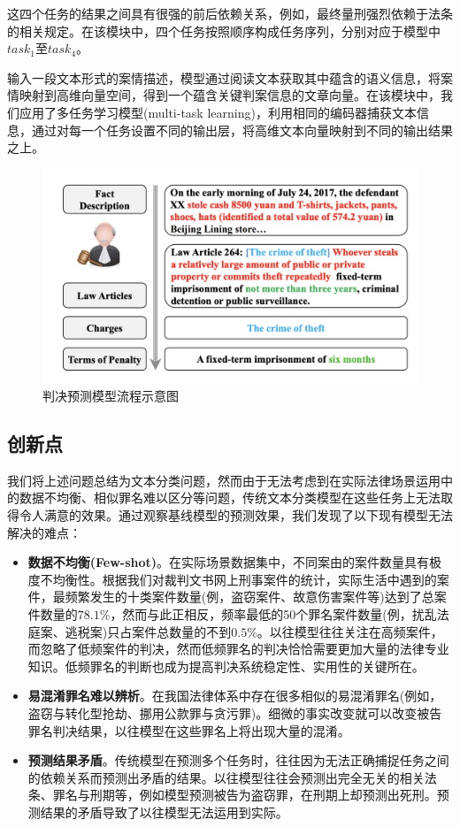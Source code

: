 这四个任务的结果之间具有很强的前后依赖关系，例如，最终量刑强烈依赖于法条的相关规定。在该模块中，四个任务按照顺序构成任务序列，分别对应于模型中$task_{1}$至$task_{4}$。

输入一段文本形式的案情描述，模型通过阅读文本获取其中蕴含的语义信息，将案情映射到高维向量空间，得到一个蕴含关键判案信息的文章向量。在该模块中，我们应用了多任务学习模型(multi-task learning)，利用相同的编码器捕获文本信息，通过对每一个任务设置不同的输出层，将高维文本向量映射到不同的输出结果之上。
\begin{figure}[ht]
    \centering
    \includegraphics[width=\linewidth]{figures/JudgePrediction.png}
    \caption{判决预测模型流程示意图}
    \label{fig:JudgePrediction}
\end{figure}


\subsection{创新点}
我们将上述问题总结为文本分类问题，然而由于无法考虑到在实际法律场景运用中的数据不均衡、相似罪名难以区分等问题，传统文本分类模型在这些任务上无法取得令人满意的效果。通过观察基线模型的预测效果，我们发现了以下现有模型无法解决的难点：
\begin{itemize}
	\item \textbf{数据不均衡(Few-shot)}。在实际场景数据集中，不同案由的案件数量具有极度不均衡性。根据我们对裁判文书网上刑事案件的统计，实际生活中遇到的案件，最频繁发生的十类案件数量(例，盗窃案件、故意伤害案件等)达到了总案件数量的$78.1\%$，然而与此正相反，频率最低的50个罪名案件数量(例，扰乱法庭案、逃税案)只占案件总数量的不到$0.5\%$。以往模型往往关注在高频案件，而忽略了低频案件的判决，然而低频罪名的判决恰恰需要更加大量的法律专业知识。低频罪名的判断也成为提高判决系统稳定性、实用性的关键所在。
	\item \textbf{易混淆罪名难以辨析}。在我国法律体系中存在很多相似的易混淆罪名(例如，盗窃与转化型抢劫、挪用公款罪与贪污罪)。细微的事实改变就可以改变被告罪名判决结果，以往模型在这些罪名上将出现大量的混淆。
	\item \textbf{预测结果矛盾}。传统模型在预测多个任务时，往往因为无法正确捕捉任务之间的依赖关系而预测出矛盾的结果。以往模型往往会预测出完全无关的相关法条、罪名与刑期等，例如模型预测被告为盗窃罪，在刑期上却预测出死刑。预测结果的矛盾导致了以往模型无法运用到实际。
\end{itemize}

